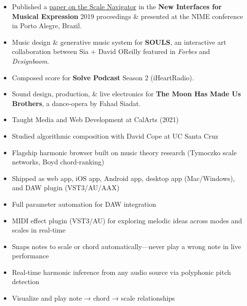 \begin{itemize}
    \item Published a \href{https://www.nime.org/proceedings/2019/nime2019_paper020.pdf}{{\color{blue} paper on the Scale Navigator}} in the \textbf{New Interfaces for Musical Expression} 2019 proceedings \& presented at the NIME conference in Porto Alegre, Brazil.
    \item Music design \& generative music system for \textbf{SOULS}, an interactive art collaboration between Sia + David OReilly featured in \textit{Forbes} and \textit{Designboom}.
    \item Composed score for \textbf{Solve Podcast} Season 2 (iHeartRadio).
    \item Sound design, production, \& live electronics for \textbf{The Moon Has Made Us Brothers}, a dance-opera by Fahad Siadat.
    \item Taught Media and Web Development at CalArts (2021)
    \item Studied algorithmic composition with David Cope at UC Santa Cruz
\end{itemize}


\begin{itemize}
\item Flagship harmonic browser built on music theory research (Tymoczko scale networks, Boyd chord-ranking)
\item Shipped as web app, iOS app, Android app, desktop app (Mac/Windows), and DAW plugin (VST3/AU/AAX)
\item Full parameter automation for DAW integration
\end{itemize}

\smallskip
{}
\begin{itemize}
  \item MIDI effect plugin (VST3/AU) for exploring melodic ideas across modes and scales in real-time
  \item Snaps notes to scale or chord automatically—never play a wrong note in live performance
\end{itemize}

\smallskip
{}
\begin{itemize}
\item Real-time harmonic inference from any audio source via polyphonic pitch detection
\item Visualize and play note → chord → scale relationships
\end{itemize}


